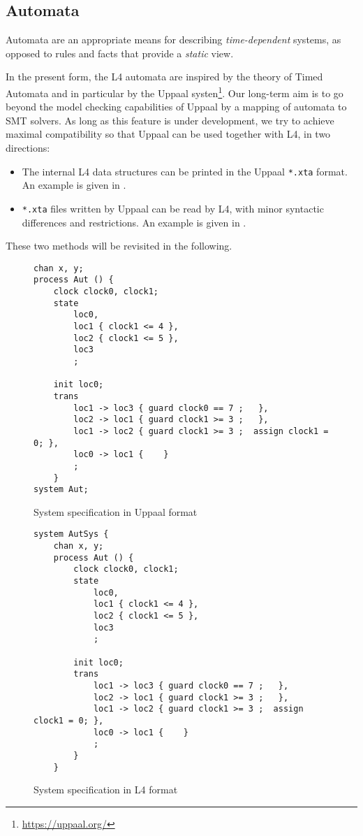 
\subsection{Automata}\label{sec:automata}

Automata are an appropriate means for describing \emph{time-dependent} systems, as
opposed to rules and facts that provide a \emph{static} view.

In the present form, the L4 automata are inspired by the theory of Timed
Automata \cite{larsen1997uppaal} and in particular by the Uppaal
systen\footnote{\url{https://uppaal.org/}}. Our long-term aim is to go beyond the model
checking capabilities of Uppaal by a mapping of automata to SMT solvers. As
long as this feature is under development, we try to achieve maximal
compatibility so that Uppaal can be used together with L4, in two directions:

\begin{itemize}
\item The internal L4 data structures can be printed in the Uppaal
  \texttt{*.xta} format. An example is given in .
\item \texttt{*.xta} files written by Uppaal can be read by L4, with minor
  syntactic differences and restrictions. An example is given in .
\end{itemize}

These two methods will be revisited in the following.

\begin{figure}
  \begin{lstlisting}
chan x, y;
process Aut () {
    clock clock0, clock1;
    state
        loc0,
        loc1 { clock1 <= 4 },
        loc2 { clock1 <= 5 },
        loc3
        ;

    init loc0;
    trans
        loc1 -> loc3 { guard clock0 == 7 ;   },
        loc2 -> loc1 { guard clock1 >= 3 ;   },
        loc1 -> loc2 { guard clock1 >= 3 ;  assign clock1 = 0; },
        loc0 -> loc1 {    }
        ;
    }
system Aut; 
  \end{lstlisting}
  \caption{System specification in Uppaal format}\label{fig:system_uppaal}
\end{figure}

\begin{figure}
  \begin{lstlisting}
system AutSys {
    chan x, y;
    process Aut () {
        clock clock0, clock1;
        state
            loc0,
            loc1 { clock1 <= 4 },
            loc2 { clock1 <= 5 },
            loc3
            ;

        init loc0;
        trans
            loc1 -> loc3 { guard clock0 == 7 ;   },
            loc2 -> loc1 { guard clock1 >= 3 ;   },
            loc1 -> loc2 { guard clock1 >= 3 ;  assign clock1 = 0; },
            loc0 -> loc1 {    }
            ;
        }
    }
  \end{lstlisting}
  \caption{System specification in L4 format}\label{fig:system_l4}
\end{figure}



